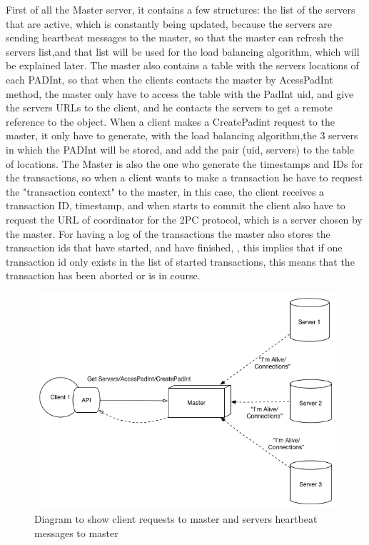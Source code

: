\documentclass[times, 10pt,twocolumn]{article}
\begin{document}
First of all the Master server, it contains a few structures: the list of the servers that are active, which is constantly being updated, because the servers are sending heartbeat messages to the master, so that the master can refresh the servers list,and that list will be used for the load balancing algorithm, which will be explained later. The master also contains a table with the servers locations of each PADInt, so that when the clients contacts the master by AcessPadInt method, the master only have to access the table with the PadInt uid, and give the servers URLs to the client, and he contacts the servers to get a remote reference to the object. When a client makes a CreatePadint request to the master, it only have to generate, with the load balancing algorithm,the 3 servers in which the PADInt will be stored, and add the pair (uid, servers) to the table of locations. The Master is also the one who generate the timestamps and IDs for the transactions, so when a client wants to make a transaction he have to request the "transaction context" to the master, in this case, the client receives a transaction ID, timestamp, and when starts to commit the client also have to request the URL of coordinator for the 2PC protocol, which is a server chosen by the master. For having a log of the transactions the master also stores the transaction ids that have started, and have finished, , this implies that if one transaction id only exists in the list of started transactions, this means that the transaction has been aborted or is in course.



\begin{figure}[h!]

\centering

\includegraphics[scale=0.4]{Client-Master.png}

\caption{Diagram to show client requests to master and servers heartbeat messages to master}

\end{figure}
\end{document}

